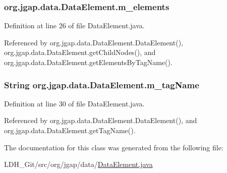 \hypertarget{classorg_1_1jgap_1_1data_1_1_data_element_a821a2c013941bea9fe9df89d46bcee28}{
\subsubsection[{m\-\_\-elements}]{ org.\-jgap.\-data.\-Data\-Element.\-m\-\_\-elements\hspace{0.3cm}{\ttfamily [private]}}}\label{classorg_1_1jgap_1_1data_1_1_data_element_a821a2c013941bea9fe9df89d46bcee28}


Definition at line 26 of file Data\-Element.\-java.



Referenced by org.\-jgap.\-data.\-Data\-Element.\-Data\-Element(), org.\-jgap.\-data.\-Data\-Element.\-get\-Child\-Nodes(), and org.\-jgap.\-data.\-Data\-Element.\-get\-Elements\-By\-Tag\-Name().

\hypertarget{classorg_1_1jgap_1_1data_1_1_data_element_a9c0b23343bbaaff585142c35b0c72173}{
\subsubsection[{m\-\_\-tag\-Name}]{\setlength{\rightskip}{0pt plus 5cm}String org.\-jgap.\-data.\-Data\-Element.\-m\-\_\-tag\-Name\hspace{0.3cm}{\ttfamily [private]}}}\label{classorg_1_1jgap_1_1data_1_1_data_element_a9c0b23343bbaaff585142c35b0c72173}


Definition at line 30 of file Data\-Element.\-java.



Referenced by org.\-jgap.\-data.\-Data\-Element.\-Data\-Element(), and org.\-jgap.\-data.\-Data\-Element.\-get\-Tag\-Name().



The documentation for this class was generated from the following file\-:\begin{DoxyCompactItemize}
\item 
L\-D\-H\-\_\-\-Git/src/org/jgap/data/\hyperlink{_data_element_8java}{Data\-Element.\-java}\end{DoxyCompactItemize}
